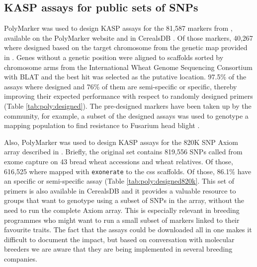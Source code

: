 \subsection{KASP assays for public sets of SNPs} 

PolyMarker was used to design KASP assays for the 81,587 markers from \citep{Wang2014}, available on the PolyMarker website and in CerealsDB \citep{Wilkinson2012}. 
Of those markers, 40,267 where designed based on the target chromosome from the genetic map provided in \citet{Wang2014}.  
Genes without a genetic position were aligned to scaffolds sorted by chromosome arms from the International Wheat Genome Sequencing Consortium \citep{Mayer2014} with BLAT \citep{Kent2002} and the best hit was selected as the putative location. 
97.5\% of the assays where designed and 76\% of them are semi-specific or specific, thereby improving their expected performance with respect to randomly designed primers (Table \ref{tab:poly:designed}). 
The pre-designed markers have been taken up by the community, for example, a subset of the designed assays was used to genotype a mapping population to find resistance to Fusarium head blight \citep{Burt2015}. 


Also, PolyMarker was used to design KASP assays for the 820K SNP Axiom array described in \citet{Winfield2016}. 
Briefly, the original set contains 819,556 SNPs called from exome capture on 43 bread wheat accessions and wheat relatives. 
Of those, 616,525 where mapped with \verb|exonerate| \citep{Slater2005} to the \acrshort{css} scaffolds. 
Of those, 86.1\% have an specific or semi-specific assay (Table \ref{tab:poly:designed820k}. 
This set of primers is also available in CerealsDB and it provides a valuable resource to groups that want to genotype using a subset of SNPs in the array, without the need to run the complete Axiom array.
This is especially relevant in breeding programmes who might want to run a small subset of markers linked to their favourite traits. 
The fact that the assays could be downloaded all in one makes it difficult to document the impact, but based on conversation with molecular breeders we are aware that they are being implemented in several breeding companies. 




